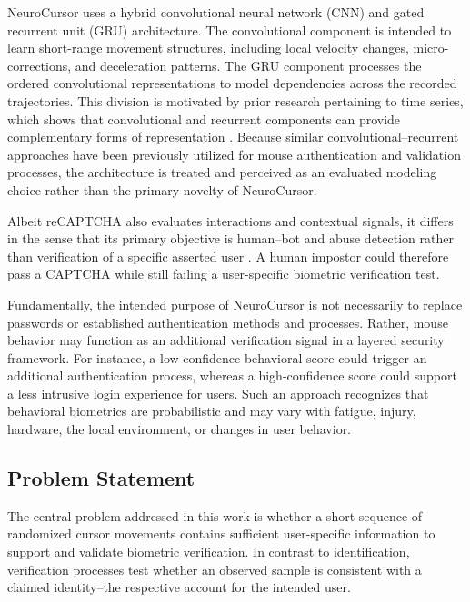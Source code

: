 \documentclass[conference]{IEEEtran}
\begin{document}
NeuroCursor uses a hybrid convolutional neural network (CNN) and gated recurrent unit (GRU) architecture. The convolutional component is intended to learn short-range movement structures, including local velocity changes, micro-corrections, and deceleration patterns. The GRU component processes the ordered convolutional representations to model dependencies across the recorded trajectories. This division is motivated by prior research pertaining to time series, which shows that convolutional and recurrent components can provide complementary forms of representation \cite{foumaniTimeSeriesSurvey, elsayedGRUFCN}. Because similar convolutional--recurrent approaches have been previously utilized for mouse authentication and validation processes, the architecture is treated and perceived as an evaluated modeling choice rather than the primary novelty of NeuroCursor. 

Albeit reCAPTCHA also evaluates interactions and contextual signals, it differs in the sense that its primary objective is human--bot and abuse detection rather than verification of a specific asserted user \cite{googleRecaptchaV3}. A human impostor could therefore pass a CAPTCHA while still failing a user-specific biometric verification test. 

Fundamentally, the intended purpose of NeuroCursor is not necessarily to replace passwords or established authentication methods and processes. Rather, mouse behavior may function as an additional verification signal in a layered security framework. For instance, a low-confidence behavioral score could trigger an additional authentication process, whereas a high-confidence score could support a less intrusive login experience for users. Such an approach recognizes that behavioral biometrics are probabilistic and may vary with fatigue, injury, hardware, the local environment, or changes in user behavior.   

\subsection{Problem Statement}

The central problem addressed in this work is whether a short sequence of randomized cursor movements contains sufficient user-specific information to support and validate biometric verification. In contrast to identification, verification processes test whether an observed sample is consistent with a claimed identity--the respective account for the intended user. 
\end{document}
